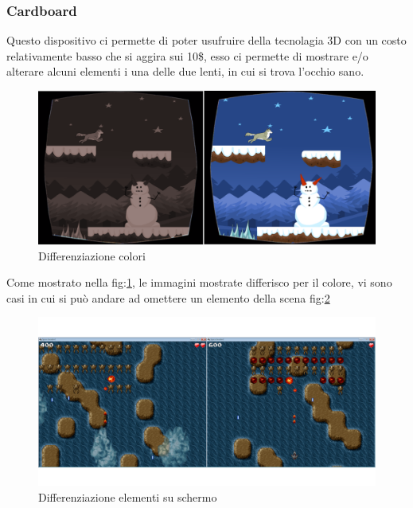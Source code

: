 \documentclass[10pt,a4paper]{article}
\begin{document}
	\subsubsection{Cardboard}\label{chap:cardboard}
	Questo dispositivo ci permette di poter usufruire della tecnolagia 3D con un costo relativamente basso che si aggira sui 10\$, esso ci permette di mostrare e/o alterare alcuni elementi i una delle due lenti, in cui si trova l'occhio sano. 
	\begin{figure}[H]
		\centering
		\includegraphics[width=0.6\linewidth]{image/3D4Amb_1}
		\caption{Differenziazione colori }
		\label{fig:cardboard-3D4Amb_colori}
	\end{figure}

    Come mostrato nella fig:\ref{fig:cardboard-3D4Amb_colori}, le immagini mostrate differisco per il colore, vi sono casi in cui si può andare ad omettere un elemento della scena fig:\ref{fig:cardboard-3D4Amb_elementi}
    	\begin{figure}[H]
    	\centering
    	\includegraphics[width=0.8\linewidth]{image/3D4Amb_2}
    	\caption{Differenziazione elementi su schermo }
    	\label{fig:cardboard-3D4Amb_elementi}
    \end{figure}
	\newpage
\end{document}
